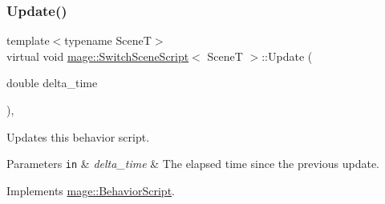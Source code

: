 \subsubsection{\texorpdfstring{Update()}{Update()}}
{\footnotesize\ttfamily template$<$typename SceneT$>$ \\
virtual void \hyperlink{classmage_1_1_switch_scene_script}{mage\+::\+Switch\+Scene\+Script}$<$ SceneT $>$\+::Update (\begin{DoxyParamCaption}\item[{double}]{delta\+\_\+time }\end{DoxyParamCaption})\hspace{0.3cm}{\ttfamily [override]}, {\ttfamily [virtual]}}

Updates this behavior script.


\begin{DoxyParams}[1]{Parameters}
\mbox{\tt in}  & {\em delta\+\_\+time} & The elapsed time since the previous update. \\
\hline
\end{DoxyParams}


Implements \hyperlink{classmage_1_1_behavior_script_a905b6c83640cb91d19fecab3435f6feb}{mage\+::\+Behavior\+Script}.

